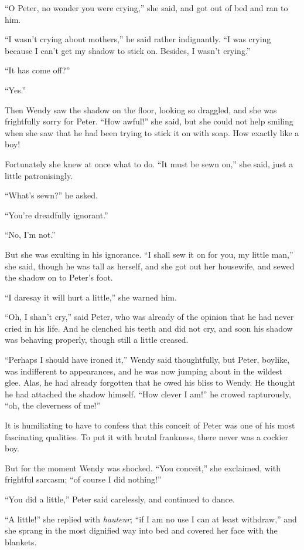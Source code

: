 “O Peter, no wonder you were crying,” she said, and got out of bed and ran to him.

“I wasn’t crying about mothers,” he said rather indignantly.
“I was crying because I can’t get my shadow to stick on.
Besides, I wasn’t crying.”

“It has come off?”

“Yes.”

Then Wendy saw the shadow on the floor, looking so draggled,
and she was frightfully sorry for Peter.
“How awful!\@” she said,
but she could not help smiling when she saw that he had been trying to stick it on with soap.
How exactly like a boy!

Fortunately she knew at once what to do.
“It must be sewn on,” she said, just a little patronisingly.

“What’s sewn?\@” he asked.

“You’re dreadfully ignorant.”

“No, I’m not.”

But she was exulting in his ignorance.
“I shall sew it on for you, my little man,” she said,
though he was tall as herself,
and she got out her housewife, and sewed the shadow on to Peter’s foot.

“I daresay it will hurt a little,” she warned him.

“Oh, I shan’t cry,” said Peter,
who was already of the opinion that he had never cried in his life.
And he clenched his teeth and did not cry,
and soon his shadow was behaving properly, though still a little creased.

“Perhaps I should have ironed it,” Wendy said thoughtfully,
but Peter, boylike, was indifferent to appearances,
and he was now jumping about in the wildest glee.
Alas, he had already forgotten that he owed his bliss to Wendy.
He thought he had attached the shadow himself.
“How clever I am!\@” he crowed rapturously, “oh, the cleverness of me!”

It is humiliating to have to confess that this conceit of Peter was one of his most fascinating qualities.
To put it with brutal frankness, there never was a cockier boy.

But for the moment Wendy was shocked.
“You conceit,” she exclaimed, with frightful sarcasm;
“of course I did nothing!”

“You did a little,” Peter said carelessly, and continued to dance.

“A little!\@” she replied with \emph{hauteur};
“if I am no use I can at least withdraw,”
and she sprang in the most dignified way into bed and covered her face with the blankets.


